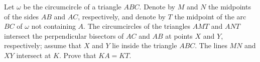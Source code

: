 Let $\omega$ be the circumcircle of a triangle $ABC$. Denote by $M$ and $N$ the midpoints of the sides $AB$ and $AC$, respectively, and denote by $T$ the midpoint of the arc $BC$ of $\omega$ not containing $A$. The circumcircles of the triangles $AMT$ and $ANT$ intersect the perpendicular bisectors of $AC$ and $AB$ at points $X$ and $Y$, respectively; assume that $X$ and $Y$ lie inside the triangle $ABC$. The lines $MN$ and $XY$ intersect at $K$. Prove that $KA = KT$.
